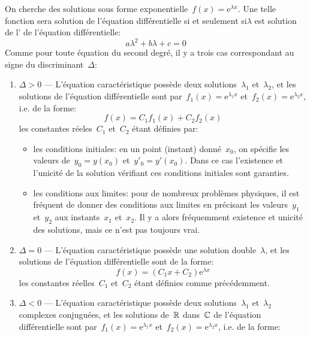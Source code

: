 On cherche des solutions sous forme exponentielle~$f(x) = \mathrm{e}^{\lambda x}$. Une telle fonction sera solution de l'équation différentielle si et seulement si$\lambda$ est solution de l' de l'équation différentielle:
\begin{equation}
a\lambda^2 + b\lambda + c = 0
\end{equation}
Comme pour toute équation du second degré, il y a trois cas correspondant au signe du discriminant~$\Delta$:
\begin{enumerate}
\item$\Delta>0$ --- L'équation caractéristique possède deux solutions~$\lambda_1$ et~$\lambda_2$, et les solutions de l'équation différentielle sont  par~$f_1(x) = \mathrm{e}^{\lambda_1x}$ et~$f_2(x) = \mathrm{e}^{\lambda_2x}$, i.e. de la forme:
\begin{equation}
f(x) = C_1f_1(x) + C_2f_2(x)
\end{equation}
les constantes réeles~$C_1$ et~$C_2$ étant définies par: 
\begin{itemize} 
\item les conditions initiales: en un point (instant) donné~$x_0$, on spécifie les valeurs de~$y_0=y(x_0)$ et~$y'_0=y'(x_0)$. Dans ce cas l'existence et l'unicité de la solution vérifiant ces conditions initiales sont garanties. 
\item les conditions aux limites: pour de nombreux problèmes physiques, il est fréquent de donner des conditions aux limites en précisant les valeurs~$y_1$et~$y_2$ aux instants~$x_1$ et~$x_2$. Il y a alors fréquemment existence et unicité des solutions, mais ce n'est pas toujours vrai. 
\end{itemize} 
\item$\Delta=0$ --- L'équation caractéristique possède une solution double~$\lambda$, et les solutions de l'équation différentielle sont de la forme:
\begin{equation}
f(x) = (C_1 x + C_2)\mathrm{e}^{\lambda x}
\end{equation}
les constantes réelles~$C_1$ et~$C_2$ étant définies comme précédemment. 
\item$\Delta<0$ --- L'équation caractéristique possède deux solutions~$\lambda_1$ et~$\lambda_2$ complexes conjuguées, et les solutions de~$\mathbb R$ dans~$\mathbb C$ de l'équation différentielle sont  par~$f_1(x) = \mathrm{e}^{\lambda_1x}$ et~$f_2(x) = \mathrm{e}^{\lambda_2x}$, i.e. de la forme:
\begin{equation}

\end{equation}
\end{enumerate}
